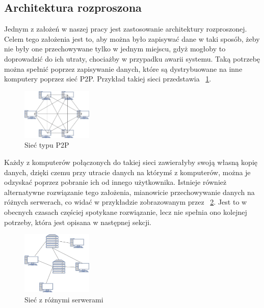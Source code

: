 \subsection{Architektura rozproszona}
\label{ssec:Rozproszenie}
Jednym z założeń w naszej pracy jest zastosowanie architektury rozproszonej. Celem tego założenia jest to, aby można było zapisywać dane w taki sposób, żeby nie były one przechowywane tylko w jednym miejscu, gdyż mogłoby to doprowadzić do ich utraty, chociażby w przypadku awarii systemu. Taką potrzebę można spełnić poprzez zapisywanie danych, które są dystrybuowane na inne komputery poprzez sieć P2P. Przykład takiej sieci przedstawia \figurename{~\ref{fig:P2P}}.
\begin{figure}[!ht]
	\centering
		\includegraphics[width=0.3\textwidth]{Images/P2P.jpg}
	\caption{Sieć typu P2P}
	\label{fig:P2P}
\end{figure}
\newline Każdy z komputerów połączonych do takiej sieci zawierałyby swoją własną kopię danych, dzięki czemu przy utracie danych na którymś z komputerów, można je odzyskać poprzez pobranie ich od innego użytkownika.
Istnieje również alternatywne rozwiązanie tego założenia, mianowicie przechowywanie danych na różnych serwerach, co widać w przykładzie zobrazowanym przez \figurename{~\ref{fig:SiecSerwery}}. Jest to w obecnych czasach częściej spotykane rozwiązanie, lecz nie spełnia ono kolejnej potrzeby, która jest opisana w następnej sekcji.
\begin{figure}[!ht]
	\centering
		\includegraphics[width=0.3\textwidth]{Images/Siec_serwery.jpg}
	\caption{Sieć z różnymi serwerami}
	\label{fig:SiecSerwery}
\end{figure}
\newline


